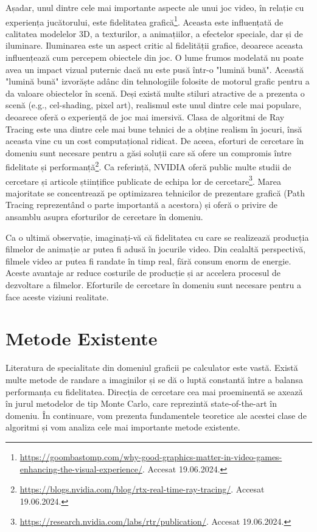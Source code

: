 \documentclass[12pt,a4paper]{report}
\numberwithin{equation}{section} %
\begin{document}
Așadar, unul dintre cele mai importante aspecte ale unui joc video, în relație cu
experiența jucătorului, este fidelitatea grafică\footnote{\url{https://goombastomp.com/why-good-graphics-matter-in-video-games-enhancing-the-visual-experience/}. Accesat 19.06.2024.}. Aceasta este influențată de
calitatea modelelor 3D, a texturilor, a animațiilor, a efectelor speciale, dar
și de iluminare. Iluminarea este un aspect critic al fidelității grafice, deoarece
aceasta influențează cum percepem obiectele din joc. O lume frumos modelată nu
poate avea un impact vizual puternic dacă nu este pusă într-o "lumină bună".
Această "lumină bună" izvorăște adânc din tehnologiile folosite de motorul grafic
pentru a da valoare obiectelor în scenă. Deși există multe stiluri atractive de
a prezenta o scenă (e.g., cel-shading, pixel art), realismul este unul dintre cele
mai populare, deoarece oferă o experiență de joc mai imersivă. Clasa de algoritmi
de Ray Tracing este una dintre cele mai bune tehnici de a obține realism în jocuri,
însă aceasta vine cu un cost computațional ridicat. De aceea, eforturi de cercetare
în domeniu sunt necesare pentru a găsi soluții care să ofere un compromis între
fidelitate și performanță\footnote{\url{https://blogs.nvidia.com/blog/rtx-real-time-ray-tracing/}. Accesat 19.06.2024.}.
Ca referință, NVIDIA oferă public multe studii de cercetare și articole științifice
publicate de echipa lor de cercetare\footnote{\url{https://research.nvidia.com/labs/rtr/publication/}. Accesat 19.06.2024.}.
Marea majoritate se concentrează pe optimizarea tehnicilor de prezentare grafică
(Path Tracing reprezentând o parte importantă a acestora) și oferă o privire de
ansamblu asupra eforturilor de cercetare în domeniu.

Ca o ultimă observație, imaginați-vă că fidelitatea cu care se realizează
producția filmelor de animație ar putea fi adusă în jocurile video. Din cealaltă
perspectivă, filmele video ar putea fi randate în timp real, fără consum enorm
de energie. Aceste avantaje ar reduce costurile de producție și ar accelera
procesul de dezvoltare a filmelor. Eforturile de cercetare în domeniu sunt
necesare pentru a face aceste viziuni realitate.

\chapter{\label{sec:stateoftheart}Metode Existente}

Literatura de specialitate din domeniul graficii pe calculator este vastă. Există
multe metode de randare a imaginilor și se dă o luptă constantă între a balansa
performanța cu fidelitatea. Direcția de cercetare cea mai proeminentă se axează
în jurul metodelor de tip Monte Carlo, care reprezintă state-of-the-art în
domeniu. În continuare, vom prezenta fundamentele teoretice ale acestei clase de
algoritmi și vom analiza cele mai importante metode existente.
\end{document}
